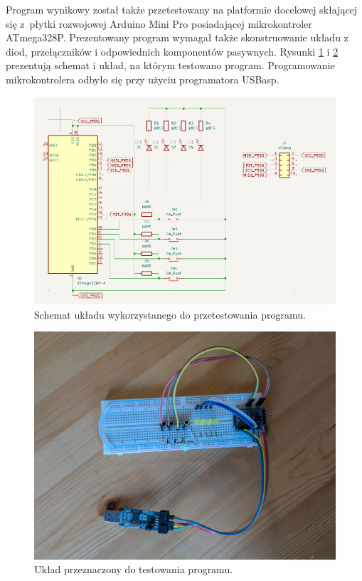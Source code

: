Program wynikowy został także przetestowany na platformie docelowej skłającej się z~płytki rozwojowej Arduino Mini Pro posiadającej mikrokontroler ATmega328P. Prezentowany program wymagał także skonstruowanie układu z diod, przełączników i odpowiednich komponentów pasywnych. Rysunki \ref{fig:schematic} i \ref{fig:electronics} prezentują schemat i układ, na którym testowano program. Programowanie mikrokontrolera odbyło się przy użyciu programatora USBasp.

\begin{figure}
	\includegraphics[width=1\textwidth]{graf/schematic.png}
	\caption{Schemat układu wykorzystanego do przetestowania programu.}
	\label{fig:schematic}
\end{figure}

\begin{figure}
	\includegraphics[width=1\textwidth]{graf/circuit.jpg}
	\caption{Układ przeznaczony do testowania programu.}
	\label{fig:electronics}
\end{figure}

